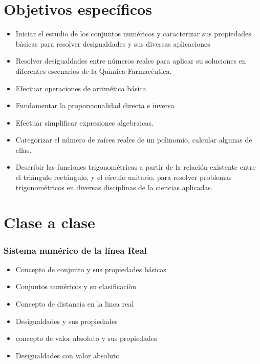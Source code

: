 \documentclass[]{book}
\providecommand{\tightlist}{%
  \setlength{\itemsep}{0pt}\setlength{\parskip}{0pt}}
\theoremstyle{definition}
\theoremstyle{definition}
\theoremstyle{definition}
\theoremstyle{remark}
\begin{document}
\hypertarget{objetivos-especuxedficos}{%
\section{Objetivos específicos}\label{objetivos-especuxedficos}}

\begin{itemize}
\tightlist
\item
  Iniciar el estudio de los conjuntos numéricos y caracterizar sus
  propiedades básicas para resolver desigualdades y sus diversas aplicaciones
\item
  Resolver desigualdades entre números reales para aplicar su soluciones en
  diferentes escenarios de la Química Farmacéutica.
\item
  Efectuar operaciones de aritmética básica
\item
  Fundamentar la proporcionalidad directa e inversa
\item
  Efectuar simplificar expresiones algebraicas.
\item
  Categorizar el número de raíces reales de un polinomio, calcular algunas de ellas.
\item
  Describir las funciones trigonométricas a partir de la relación existente entre el triángulo rectángulo, y el círculo unitario, para resolver problemas trigonométricos en diversas disciplinas de la ciencias aplicadas.
\end{itemize}

\hypertarget{clase-a-clase}{%
\section{\texorpdfstring{\textbf{Clase a clase}}{Clase a clase}}\label{clase-a-clase}}

\hypertarget{sistema-numuxe9rico-de-la-luxednea-real}{%
\subsubsection{\texorpdfstring{\textbf{Sistema numérico de la línea Real}}{Sistema numérico de la línea Real}}\label{sistema-numuxe9rico-de-la-luxednea-real}}

\begin{itemize}
\tightlist
\item
  Concepto de conjunto y sus propiedades básicas
\item
  Conjuntos numéricos y su clasificaciòn
\item
  Concepto de distancia en la linea real
\item
  Desigualdades y sus propiedades
\item
  concepto de valor absoluto y sus propiedades
\item
  Desigualdades con valor absoluto
\end{itemize}
\end{document}
